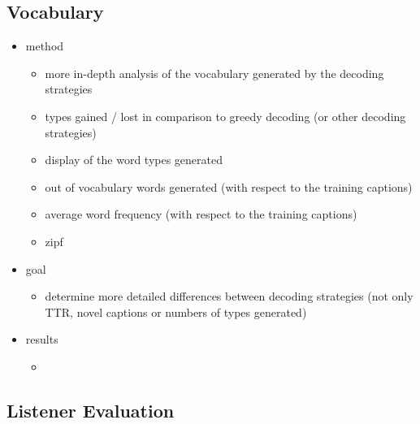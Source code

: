 \documentclass[11pt,a4paper]{article}
\begin{document}
\subsection{Vocabulary}

\begin{itemize}

\item method
	\begin{itemize}
	\item more in-depth analysis of the vocabulary generated by the decoding strategies
	\item types gained / lost in comparison to greedy decoding (or other decoding strategies)
	\item display of the word types generated
	\item out of vocabulary words generated (with respect to the training captions)
	\item average word frequency (with respect to the training captions)
	\item zipf
	\end{itemize}

\item goal
	\begin{itemize}
	\item determine more detailed differences between decoding strategies (not only TTR, novel captions or numbers of types generated)
	\end{itemize}

\item results
	\begin{itemize}
	\item
	\end{itemize}

\end{itemize}

\subsection{Listener Evaluation}
\end{document}
